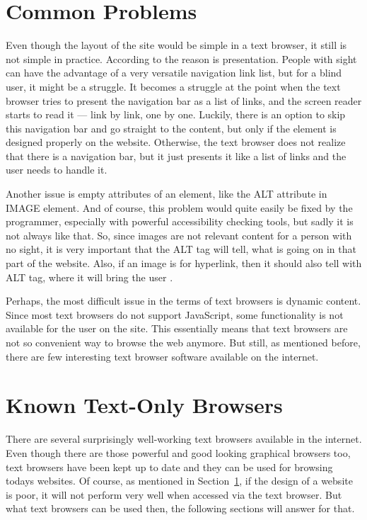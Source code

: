 \section{Common Problems}%
\label{sec:tb-problems}

Even though the layout of the site would be simple in a text browser, it still
is not simple in practice. According to \textcite[Chapter 5]{webbie} the
reason is presentation. People with sight can have the advantage of a very
versatile navigation link list, but for a blind user, it might be a
struggle. It becomes a struggle at the point when the text browser tries to
present the navigation bar as a list of links, and the screen reader starts to
read it --- link by link, one by one. Luckily, there is an option to
skip this navigation bar and go straight to the content, but only if
the element is designed properly on the website. Otherwise, the text
browser does not realize that there is a navigation bar, but it just
presents it like a list of links and the user needs to handle it.

Another issue is empty attributes of an element, like the ALT attribute in
IMAGE element. And of course, this problem would quite easily be fixed
by the programmer, especially with powerful accessibility checking
tools, but sadly it is not always like that. So, since images are not
relevant content for a person with no sight, it is very important that
the ALT tag will tell, what is going on in that part of the
website. Also, if an image is for hyperlink, then it should also tell
with ALT tag, where it will bring the user \parencite[Chapter 5]{webbie}.

Perhaps, the most difficult issue in the terms of text browsers is
dynamic content. Since most text browsers do not support JavaScript,
some functionality is not available for the user on the site. This
essentially means that text browsers are not so convenient
way to browse the web anymore. But still, as mentioned before,
there are few interesting text browser software available on the
internet.


\section{Known Text-Only Browsers}%
\label{sec:tb-browsers}

There are several surprisingly well-working text browsers available 
in the internet. Even though there are those powerful and good looking 
graphical browsers too, text browsers have been kept up to date 
and they can be used for browsing todays websites. Of course, 
as mentioned in Section~\ref{sec:tb-problems}, if the design 
of a website is poor, it will not perform very well when accessed 
via the text browser. But what text browsers can be used then, 
the following sections will answer for that.


